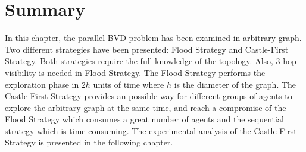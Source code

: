 \section{Summary}
In this chapter, the parallel BVD problem has been examined in arbitrary graph. Two different strategies have been presented: Flood Strategy and Castle-First Strategy. Both strategies require the full knowledge of the topology. Also, 3-hop visibility is needed in Flood Strategy. The Flood Strategy performs the exploration phase in $2h$ units of time where $h$ is the diameter of the graph. The Castle-First Strategy provides an possible way for different groups of agents to explore the arbitrary graph at the same time, and reach a compromise of the Flood Strategy which consumes a great number of agents and the sequential strategy which is time consuming. The experimental analysis of the Castle-First Strategy is presented in the following chapter. 
\color{black}










































 